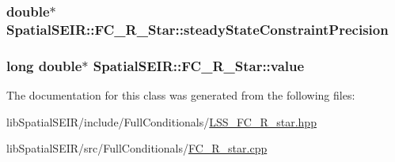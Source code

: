\hypertarget{classSpatialSEIR_1_1FC__R__Star_a495244734c4c39dc118ceef404062c70}{
\subsubsection[{steady\-State\-Constraint\-Precision}]{\setlength{\rightskip}{0pt plus 5cm}double$\ast$ Spatial\-S\-E\-I\-R\-::\-F\-C\-\_\-\-R\-\_\-\-Star\-::steady\-State\-Constraint\-Precision}}\label{classSpatialSEIR_1_1FC__R__Star_a495244734c4c39dc118ceef404062c70}
\hypertarget{classSpatialSEIR_1_1FC__R__Star_ab7dbeeefaeeafdf681e13f19e50055c3}{
\subsubsection[{value}]{\setlength{\rightskip}{0pt plus 5cm}long double$\ast$ Spatial\-S\-E\-I\-R\-::\-F\-C\-\_\-\-R\-\_\-\-Star\-::value}}\label{classSpatialSEIR_1_1FC__R__Star_ab7dbeeefaeeafdf681e13f19e50055c3}


The documentation for this class was generated from the following files\-:\begin{DoxyCompactItemize}
\item 
lib\-Spatial\-S\-E\-I\-R/include/\-Full\-Conditionals/\hyperlink{LSS__FC__R__star_8hpp}{L\-S\-S\-\_\-\-F\-C\-\_\-\-R\-\_\-star.\-hpp}\item 
lib\-Spatial\-S\-E\-I\-R/src/\-Full\-Conditionals/\hyperlink{FC__R__star_8cpp}{F\-C\-\_\-\-R\-\_\-star.\-cpp}\end{DoxyCompactItemize}

